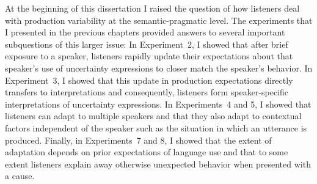 

At the beginning of this dissertation I raised the question of how listeners deal with production variability at the semantic-pragmatic level. The experiments that I presented in the previous chapters provided answers to several important subquestions of this larger issue: In Experiment~2, I showed that after brief exposure to a speaker, listeners rapidly update their expectations about that speaker's use of uncertainty expressions to closer match the speaker's behavior. In Experiment~3, I showed that this update in production expectations directly transfers to interpretations and consequently, listeners form speaker-specific interpretations of uncertainty expressions. In Experiments~4 and 5, I showed that listeners can adapt to multiple speakers and that they also adapt to contextual factors independent of the speaker such as the situation in which an utterance is produced. Finally, in Experiments~7 and 8, I showed that the extent of adaptation depends on prior expectations of language use and that to some extent listeners explain away otherwise unexpected behavior when presented with a cause.

